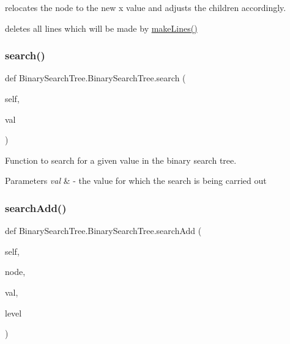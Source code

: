 relocates the node to the new x value and adjusts the children accordingly. 

deletes all lines which will be made by \hyperlink{class_binary_search_tree_1_1_binary_search_tree_a64a520f74e40f705873893befbe905c3}{make\+Lines()} \mbox{\label{class_binary_search_tree_1_1_binary_search_tree_a250e673d04491e5d995b08b36e10072d}} 
\subsubsection{\texorpdfstring{search()}{search()}}
{\footnotesize\ttfamily def Binary\+Search\+Tree.\+Binary\+Search\+Tree.\+search (\begin{DoxyParamCaption}\item[{}]{self,  }\item[{}]{val }\end{DoxyParamCaption})}



Function to search for a given value in the binary search tree. 


\begin{DoxyParams}{Parameters}
{\em val} & -\/ the value for which the search is being carried out \\
\hline
\end{DoxyParams}
\mbox{\label{class_binary_search_tree_1_1_binary_search_tree_a5168edcb8e13e75c4d9f9d016cf922e0}} 
\subsubsection{\texorpdfstring{search\+Add()}{searchAdd()}}
{\footnotesize\ttfamily def Binary\+Search\+Tree.\+Binary\+Search\+Tree.\+search\+Add (\begin{DoxyParamCaption}\item[{}]{self,  }\item[{}]{node,  }\item[{}]{val,  }\item[{}]{level }\end{DoxyParamCaption})}



